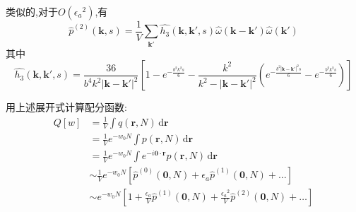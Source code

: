类似的,对于$O({\epsilon_a}^2)$,有
\begin{equation}
{\hat{p}}^{(2)}(\mathbf{k},s) = \frac{1}{V} \sum_{\mathbf{k}'} \hat{h_3}(\mathbf{k},\mathbf{k}',s)\hat{\omega}(\mathbf{k}-\mathbf{k}')\hat{\omega}(\mathbf{k}')
\end{equation}
其中
\begin{equation}
\hat{h_3}(\mathbf{k},\mathbf{k}',s) = \frac{36}{b^4 k^2 {|\mathbf{k}-\mathbf{k}'|}^2} [1-e^{-\frac{b^2 k^2 s}{6}}-\frac{k^2}{k^2-{|\mathbf{k}-\mathbf{k}'|}^2}(e^{-\frac{b^2 {|\mathbf{k}-\mathbf{k}'|}^2 s}{6}}-e^{-\frac{b^2 k^2 s}{6}})]
\end{equation}

用上述展开式计算配分函数:
\begin{equation}
\begin{aligned}
   Q[w] &= \frac{1}{V} \int q(\mathbf{r},N)\,\mathrm{d}\mathbf{r}\\
&= \frac{1}{V} e^{-w_0 N} \int p(\mathbf{r},N)\,\mathrm{d} \mathbf{r}\\
&= \frac{1}{V} e^{-w_0 N} \int {e^{-i \mathbf{0} \cdot \mathbf{r}} p(\mathbf{r},N)}\,\mathrm{d} \mathbf{r}\\
&\sim \frac{1}{V} e^{-w_0 N} [\hat{p}^{(0)}(\mathbf{0},N)+\epsilon_a \hat{p}^{(1)}(\mathbf{0},N)+\dots]\\
&\sim e^{-w_0 N} [1+\frac{\epsilon_a}{V} \hat{p}^{(1)}(\mathbf{0},N)+\frac{{\epsilon_a}^2}{V} \hat{p}^{(2)}(\mathbf{0},N)+\dots]
\end{aligned}
\end{equation}

